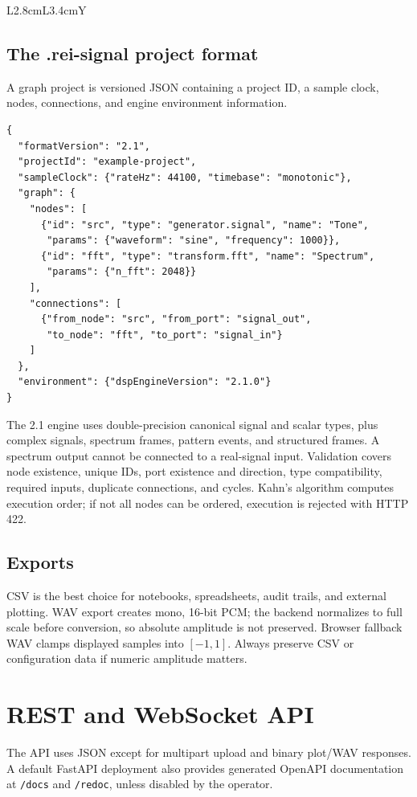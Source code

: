 \documentclass[10pt,a4paper]{article}
\newcommand{\code}[1]{\nolinkurl{#1}}
\begin{document}
\begin{tabularx}{\textwidth}{L{2.8cm}L{3.4cm}Y}
\subsection{The .rei-signal project format}

A graph project is versioned JSON containing a project ID, a sample clock, nodes, connections, and engine environment information.

\begin{lstlisting}[language={},caption={Minimal illustrative project}]
{
  "formatVersion": "2.1",
  "projectId": "example-project",
  "sampleClock": {"rateHz": 44100, "timebase": "monotonic"},
  "graph": {
    "nodes": [
      {"id": "src", "type": "generator.signal", "name": "Tone",
       "params": {"waveform": "sine", "frequency": 1000}},
      {"id": "fft", "type": "transform.fft", "name": "Spectrum",
       "params": {"n_fft": 2048}}
    ],
    "connections": [
      {"from_node": "src", "from_port": "signal_out",
       "to_node": "fft", "to_port": "signal_in"}
    ]
  },
  "environment": {"dspEngineVersion": "2.1.0"}
}
\end{lstlisting}

The 2.1 engine uses double-precision canonical signal and scalar types, plus complex signals, spectrum frames, pattern events, and structured frames. A spectrum output cannot be connected to a real-signal input. Validation covers node existence, unique IDs, port existence and direction, type compatibility, required inputs, duplicate connections, and cycles. Kahn's algorithm computes execution order; if not all nodes can be ordered, execution is rejected with HTTP 422.

\subsection{Exports}

CSV is the best choice for notebooks, spreadsheets, audit trails, and external plotting. WAV export creates mono, 16-bit PCM; the backend normalizes to full scale before conversion, so absolute amplitude is not preserved. Browser fallback WAV clamps displayed samples into $[-1,1]$. Always preserve CSV or configuration data if numeric amplitude matters.

\section{REST and WebSocket API}

The API uses JSON except for multipart upload and binary plot/WAV responses. A default FastAPI deployment also provides generated OpenAPI documentation at \code{/docs} and \code{/redoc}, unless disabled by the operator.


\end{tabularx}
\end{document}

